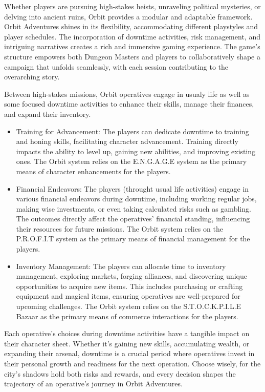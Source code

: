 Whether players are pursuing high-stakes heists, unraveling political mysteries, or delving into ancient ruins, Orbit provides a modular and adaptable framework. Orbit Adventures shines in its flexibility, accommodating different playstyles and player schedules. The incorporation of downtime activities, risk management, and intriguing narratives creates a rich and immersive gaming experience. The game's structure empowers both Dungeon Masters and players to collaboratively shape a campaign that unfolds seamlessly, with each session contributing to the overarching story.

Between high-stakes missions, Orbit operatives engage in usualy life as well as some focused downtime activities to enhance their skills, manage their finances, and expand their inventory.

\begin{itemize}
\item Training for Advancement: The players can dedicate downtime to training and honing skills, facilitating character advancement. Training directly impacts the ability to level up, gaining new abilities, and improving existing ones. The Orbit system relies on the E.N.G.A.G.E system as the primary means of character enhancements for the players.

\item Financial Endeavors: The players (throught usual life activities) engage in various financial endeavors during downtime, including working regular jobs, making wise investments, or even taking calculated risks such as gambling. The outcomes directly affect the operatives' financial standing, influencing their resources for future missions. The Orbit system relies on the P.R.O.F.I.T system as the primary means of financial management for the players.

\item Inventory Management: The players can allocate time to inventory management, exploring markets, forging alliances, and discovering unique opportunities to acquire new items. This includes purchasing or crafting equipment and magical items, ensuring operatives are well-prepared for upcoming challenges. The Orbit system relies on the S.T.O.C.K.P.I.L.E Bazaar as the primary means of commerce interactions for the players.
\end{itemize}

Each operative's choices during downtime activities have a tangible impact on their character sheet. Whether it's gaining new skills, accumulating wealth, or expanding their arsenal, downtime is a crucial period where operatives invest in their personal growth and readiness for the next operation. Choose wisely, for the city's shadows hold both risks and rewards, and every decision shapes the trajectory of an operative's journey in Orbit Adventures.


